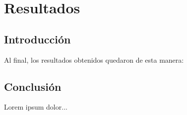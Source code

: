 
\chapter{Resultados} %

\label{Chap:Res} %

\section{Introducción}

Al final, los resultados obtenidos quedaron de esta manera: \\

\section{Conclusión}

Lorem ipsum dolor...